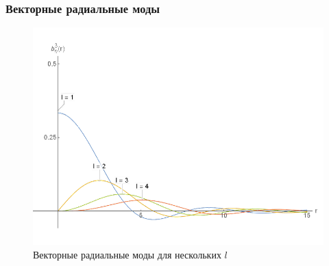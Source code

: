 \documentclass[compress]{beamer}
\begin{document}

    \begin{frame}\frametitle{Векторные радиальные моды}

        \begin{figure}[h]
            \centering
            \includegraphics[width=\textwidth,height=0.6\textheight,keepaspectratio]{radial_modes_vect_ii}
            \caption[]{Векторные радиальные моды для нескольких $l$}
            \label{fig:radial_modes_vect_ii}
        \end{figure}

    \end{frame}

\end{document}
